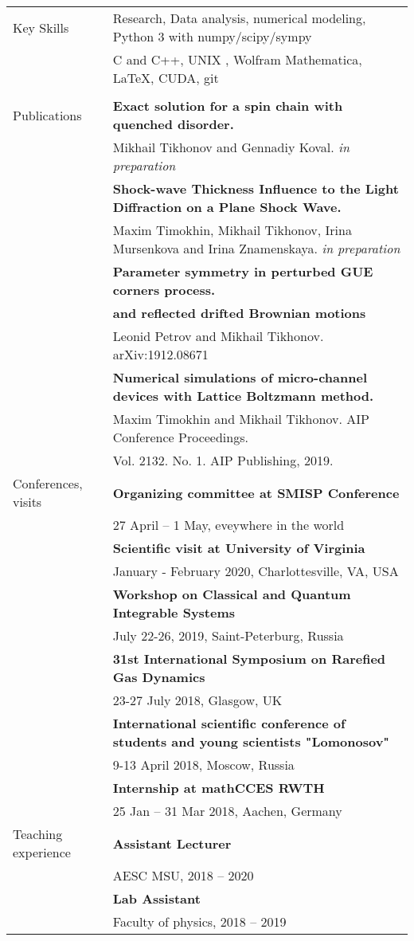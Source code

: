 \documentclass[letterpaper,10pt,oneside,utf8]{article}
\begin{document}
\begin{tabular}{@{} l l}
		
	
	    \Large {Key Skills} & Research, Data analysis, numerical modeling, Python 3 with numpy/scipy/sympy\\
	                        &C and C++, UNIX , Wolfram Mathematica, LaTeX, CUDA, git\\
        &\\
		\Large{Publications}  
		&\textbf{Exact solution for a spin chain with quenched disorder. }\\&  Mikhail Tikhonov and Gennadiy Koval. \textit{in preparation} \\
		&\textbf{Shock-wave Thickness Influence to the Light Diffraction on a Plane Shock Wave.}\\&
		Maxim Timokhin, Mikhail Tikhonov, Irina Mursenkova and Irina Znamenskaya. \textit{in preparation}\\
		&\textbf{Parameter symmetry in perturbed GUE corners process.	}\\&\textbf{and reflected drifted Brownian motions}\\& Leonid Petrov and  Mikhail Tikhonov. arXiv:1912.08671\\
		&\textbf{Numerical simulations of micro-channel devices with Lattice Boltzmann method. }\\
		&Maxim Timokhin  and Mikhail Tikhonov. AIP Conference Proceedings. \\
		&Vol. 2132. No. 1. AIP Publishing, 2019.\\
		\Large{Conferences, visits} 
		&\textbf{Organizing committee at SMISP Conference}\\
		& 27 April -- 1 May, eveywhere in the world \\
		&\textbf{Scientific visit at University of Virginia}\\
		& January - February 2020, Charlottesville, VA, USA  \\
		&\textbf{Workshop on Classical and Quantum Integrable Systems}\\
		&July 22-26, 2019, Saint-Peterburg, Russia\\
		& \textbf{31st International Symposium on Rarefied Gas Dynamics}\\
		& 23-27 July 2018, Glasgow, UK\\
		&\textbf{International scientific conference of students and young scientists "Lomonosov"}\\
		& 9-13 April 2018,  Moscow, Russia\\
		&\textbf{Internship at mathCCES RWTH}\\
		& 25 Jan -- 31 Mar 2018, Aachen, Germany \\

		\Large{Teaching experience}&
		\textbf{Assistant Lecturer}\\
		&AESC MSU, 2018 -- 2020\\
		&\textbf{Lab Assistant}\\
		&Faculty of physics, 2018 -- 2019\\

		
		
	\end{tabular}
	
\end{document}
